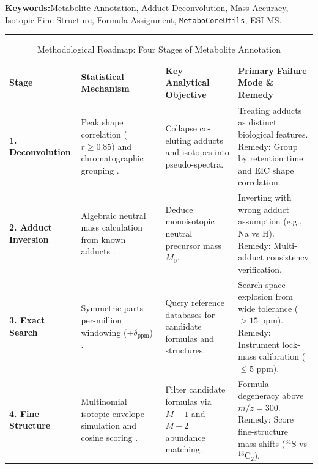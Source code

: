\documentclass[11pt,twoside,openright]{book}
\begin{document}
\noindent
\textbf{Keywords:}\enspace Metabolite Annotation, Adduct Deconvolution, Mass Accuracy, Isotopic Fine Structure, Formula Assignment, \texttt{MetaboCoreUtils}, ESI-MS.

\vspace{0.8em}
\noindent\rule{\textwidth}{0.4pt}


\begin{table}[ht]
\centering
\caption{Methodological Roadmap: Four Stages of Metabolite Annotation}
\label{tab:annotation_roadmap}
\small
\begin{tabularx}{\textwidth}{l p{3.8cm} p{4.2cm} X}
\toprule
\textbf{Stage} & \textbf{Statistical Mechanism} & \textbf{Key Analytical Objective} & \textbf{Primary Failure Mode \& Remedy} \\
\midrule
\textbf{1. Deconvolution} & Peak shape correlation ($r \ge 0.85$) and chromatographic grouping \cite{kuhl2012camera, pluskal2010mzmine}. & Collapse co-eluting adducts and isotopes into pseudo-spectra. & Treating adducts as distinct biological features. Remedy: Group by retention time and EIC shape correlation. \\
\addlinespace
\textbf{2. Adduct Inversion} & Algebraic neutral mass calculation from known adducts \cite{gross2017mass, rainer2022modular}. & Deduce monoisotopic neutral precursor mass $M_0$. & Inverting with wrong adduct assumption (e.g., Na vs H). Remedy: Multi-adduct consistency verification. \\
\addlinespace
\textbf{3. Exact Search} & Symmetric parts-per-million windowing ($\pm \delta_{\text{ppm}}$) \cite{kind2007seven, wishart2022hmdb}. & Query reference databases for candidate formulas and structures. & Search space explosion from wide tolerance ($> 15$ ppm). Remedy: Instrument lock-mass calibration ($\le 5$ ppm). \\
\addlinespace
\textbf{4. Fine Structure} & Multinomial isotopic envelope simulation and cosine scoring \cite{duehrkop2019sirius, tsugawa2015msdial}. & Filter candidate formulas via $M+1$ and $M+2$ abundance matching. & Formula degeneracy above $m/z = 300$. Remedy: Score fine-structure mass shifts ($^{34}\text{S}$ vs $^{13}\text{C}_2$). \\
\bottomrule
\end{tabularx}
\end{table}
\end{document}
